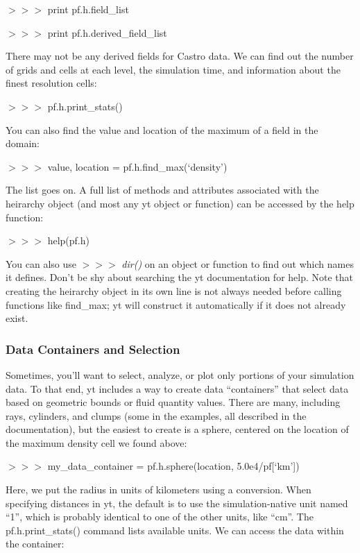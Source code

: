 {\scriptsize$>>>$} print pf.h.field\_list

{\scriptsize$>>>$} print pf.h.derived\_field\_list

There may not be any derived fields for Castro data. We can find out the number of grids and cells at each level, the simulation time, and information about the finest resolution cells:

{\scriptsize$>>>$} pf.h.print\_stats()

You can also find the value and location of the maximum  of a field in the domain:

{\scriptsize$>>>$} value, location = pf.h.find\_max(`density')

The list goes on. A full list of methods and attributes associated with the heirarchy object (and most any yt object or function) can be accessed by the help function:

{\scriptsize$>>>$} help(pf.h)

You can also use {\scriptsize$>>>$} {\it dir()} on an object or function to find out which names it defines. Don't be shy about searching the yt documentation for help. Note that creating the heirarchy object in its own line is not always needed before calling functions like find\_max; yt will construct it automatically if it does not already exist.

\subsubsection{Data Containers and Selection}

Sometimes, you'll want to select, analyze, or plot only portions of your simulation data. To that end, yt includes a way to create data ``containers'' that select data based on geometric bounds or fluid quantity values. There are many, including rays, cylinders, and clumps (some in the examples, all described in the documentation), but the easiest to create is a sphere, centered on the location of the maximum density cell we found above:

{\scriptsize$>>>$} my\_data\_container = pf.h.sphere(location, 5.0e4/pf[`km'])

Here, we put the radius in units of kilometers using a conversion. When specifying distances in yt, the default is to use the simulation-native unit named ``1'', which is probably identical to one of the other units, like ``cm''. The pf.h.print\_stats() command lists available units. We can access the data within the container:

